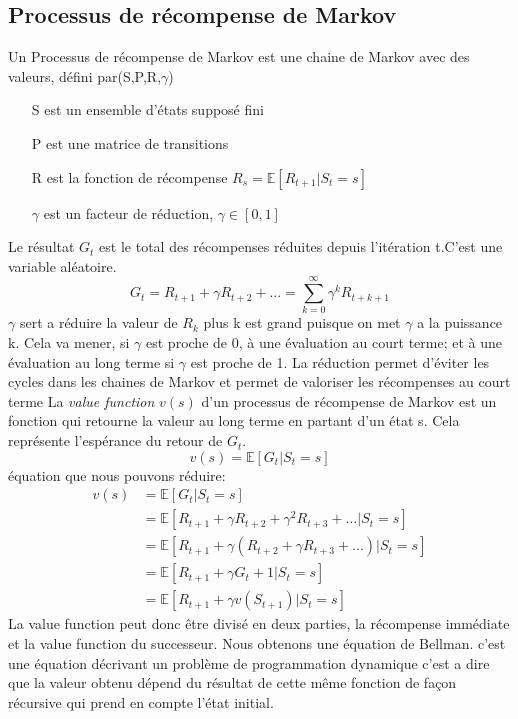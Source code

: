 \documentclass[a4paper,10pt]{article}
\begin{document}
\subsection{Processus de récompense de Markov}
Un Processus de récompense de Markov est une chaine de Markov avec des valeurs, défini par(S,P,R,$\gamma$) 
\begin{itemize}
\item[S] est un ensemble d'états supposé fini
\item[P] est une matrice de transitions 
\item[R] est la fonction de récompense $R_s = \mathbb{E}[R_{t+1}|S_t =s]$
\item[$\gamma$] est un facteur de réduction, $\gamma \in [0,1]$
\end{itemize}
\vspace{12pt}
Le résultat $G_t$ est le total des récompenses réduites depuis l'itération t.C'est une variable aléatoire.
\[G_t = R_{t+1}+\gamma R_{t+2}+...= \sum_{k=0}^{\infty}\gamma^k R_{t+k+1}\]
$\gamma$ sert a réduire la valeur de $R_k$ plus k est grand puisque on met $\gamma$ a la puissance k. Cela va mener, si  $\gamma$ est proche de 0, à une évaluation au court terme; et à une évaluation au long terme si  $\gamma$ est proche de 1. La réduction permet d'éviter les cycles dans les chaines de Markov  et permet de valoriser les récompenses au court terme 
La \textit{value function} $v(s)$ d'un processus de récompense de Markov est un fonction qui retourne la valeur au long terme en partant d'un état s. Cela représente l'espérance du retour de $G_t$.
\[v(s)=\mathbb{E}[G_t|S_t=s]\]
équation que nous pouvons réduire:
\[
\begin{aligned}
v(s)&=\mathbb{E}[G_t|S_t=s]\\
&=\mathbb{E}[R_{t+1}+\gamma R_{t+2}+\gamma^2R_{t+3}+...|S_t=s]\\
&=\mathbb{E}[R_{t+1}+\gamma(R_{t+2}+\gamma R_{t+3}+...)|S_t=s]\\
&=\mathbb{E}[R_{t+1}+\gamma G_t+1 |S_t=s]\\
&=\mathbb{E}[R_{t+1}+\gamma v(S_{t+1}) |S_t=s]
\end{aligned}
\]
La value function peut donc être divisé en deux parties, la récompense immédiate et la value function du successeur. Nous obtenons une équation de Bellman.
c'est une équation décrivant un problème de programmation dynamique c'est a dire que la valeur obtenu dépend du résultat de cette même fonction de façon récursive qui prend en compte l'état initial.
\\
\end{document}
